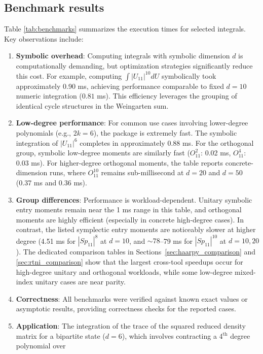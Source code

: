 \documentclass[manuscript,screen]{acmart}
\begin{document}
\subsection{Benchmark results}
Table \ref{tab:benchmarks} summarizes the execution times for selected integrals.
Key observations include:
\begin{enumerate}
    \item \textbf{Symbolic overhead}: Computing integrals with symbolic
    dimension $d$ is computationally demanding, but optimization strategies
    significantly reduce this cost. For example, computing $\int |U_{11}|^{10}
    dU$ symbolically took approximately 0.90 ms, achieving performance comparable
    to fixed $d=10$ numeric integration ($0.81$ ms). This efficiency leverages the
    grouping of identical cycle structures in the Weingarten sum.
    \item \textbf{Low-degree performance}: For common use cases involving
    lower-degree polynomials (e.g., $2k=6$), the package is extremely fast. The
    symbolic integration of $|U_{11}|^6$ completes in approximately 0.88 ms. For
    the orthogonal group, symbolic low-degree moments are similarly fast
    ($O_{11}^2$: 0.02 ms, $O_{11}^4$: 0.03 ms). For higher-degree orthogonal
    moments, the table reports concrete-dimension runs, where
    $O_{11}^{10}$ remains sub-millisecond at $d=20$ and $d=50$
    (0.37 ms and 0.36 ms).
    \item \textbf{Group differences}: Performance is workload-dependent.
    Unitary symbolic entry moments remain near the 1 ms range in this table,
    and orthogonal moments are highly efficient (especially in concrete
    high-degree cases). In contrast, the listed symplectic entry moments are
    noticeably slower at higher degree (4.51 ms for $|Sp_{11}|^8$ at $d=10$,
    and $\sim 78$--79 ms for $|Sp_{11}|^{10}$ at $d=10,20$). The dedicated
    comparison tables in Sections~\ref{sec:haarpy_comparison} and
    \ref{sec:rtni_comparison} show that the largest cross-tool speedups occur
    for high-degree unitary and orthogonal workloads, while some low-degree
    mixed-index unitary cases are near parity.
    \item \textbf{Correctness}: All benchmarks were verified against known exact
    values or asymptotic results, providing correctness checks for the reported
    cases.
    \item \textbf{Application}: The integration of the trace of the squared reduced density matrix for a bipartite state
    ($d=6$), which involves contracting a 4$^\mathrm{th}$ degree polynomial over

\end{enumerate}
\end{document}
